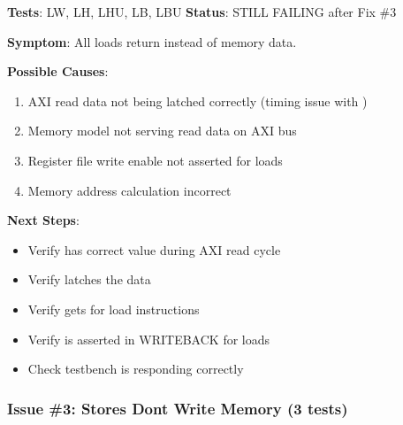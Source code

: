 \begin{record}

\textbf{Tests}: LW, LH, LHU, LB, LBU \textbf{Status}: \bad{} STILL
FAILING after Fix \#3

\textbf{Symptom}: All loads return  instead of memory
data.

\textbf{Possible Causes}:

\begin{enumerate}
\def\labelenumi{\arabic{enumi}.}
\tightlist
\item
  AXI read data not being latched correctly (timing issue with
  )
\item
  Memory model not serving read data on AXI bus
\item
  Register file write enable not asserted for loads
\item
  Memory address calculation incorrect
\end{enumerate}

\textbf{Next Steps}:

\begin{itemize}
\tightlist
\item
  Verify  has correct value during AXI read cycle
\item
  Verify  latches the data
\item
  Verify  gets  for load instructions
\item
  Verify  is asserted in WRITEBACK for loads
\item
  Check testbench  is responding correctly
\end{itemize}

\end{record}

\subsubsection{Issue \#3: Stores Don\textquotesingle t Write Memory (3
tests)}\label{cr:fix:rtl-bug-fixes:issue-3-stores-dont-write-memory-3-tests}


